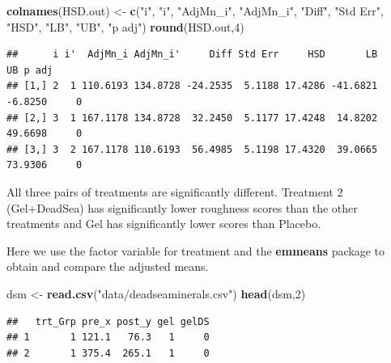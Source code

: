 \documentclass[
]{book}
\newenvironment{Shaded}{\begin{snugshade}}{\end{snugshade}}
\newcommand{\DecValTok}[1]{\textcolor[rgb]{0.00,0.00,0.81}{#1}}
\newcommand{\FunctionTok}[1]{\textcolor[rgb]{0.13,0.29,0.53}{\textbf{#1}}}
\newcommand{\NormalTok}[1]{#1}
\newcommand{\OtherTok}[1]{\textcolor[rgb]{0.56,0.35,0.01}{#1}}
\newcommand{\StringTok}[1]{\textcolor[rgb]{0.31,0.60,0.02}{#1}}
\begin{document}
\begin{Shaded}
\begin{Highlighting}[]
\FunctionTok{colnames}\NormalTok{(HSD.out) }\OtherTok{\textless{}{-}} \FunctionTok{c}\NormalTok{(}\StringTok{"i"}\NormalTok{, }\StringTok{"i\textquotesingle{}"}\NormalTok{, }\StringTok{"AdjMn\_i"}\NormalTok{, }\StringTok{"AdjMn\_i\textquotesingle{}"}\NormalTok{, }\StringTok{"Diff"}\NormalTok{, }\StringTok{"Std Err"}\NormalTok{, }
                      \StringTok{"HSD"}\NormalTok{, }\StringTok{"LB"}\NormalTok{, }\StringTok{"UB"}\NormalTok{, }\StringTok{"p adj"}\NormalTok{)}
\FunctionTok{round}\NormalTok{(HSD.out,}\DecValTok{4}\NormalTok{)}
\end{Highlighting}
\end{Shaded}

\begin{verbatim}
##      i i'  AdjMn_i AdjMn_i'     Diff Std Err     HSD       LB      UB p adj
## [1,] 2  1 110.6193 134.8728 -24.2535  5.1188 17.4286 -41.6821 -6.8250     0
## [2,] 3  1 167.1178 134.8728  32.2450  5.1177 17.4248  14.8202 49.6698     0
## [3,] 3  2 167.1178 110.6193  56.4985  5.1198 17.4320  39.0665 73.9306     0
\end{verbatim}

All three pairs of treatments are significantly different. Treatment 2
(Gel+DeadSea) has significantly lower roughness scores than the other
treatments and Gel has significantly lower scores than Placebo.

Here we use the factor variable for treatment and the \textbf{emmeans}
package to obtain and compare the adjusted means.

\begin{Shaded}
\begin{Highlighting}[]
\NormalTok{dsm }\OtherTok{\textless{}{-}} \FunctionTok{read.csv}\NormalTok{(}\StringTok{"data/deadseaminerals.csv"}\NormalTok{)}
\FunctionTok{head}\NormalTok{(dsm,}\DecValTok{2}\NormalTok{)}
\end{Highlighting}
\end{Shaded}

\begin{verbatim}
##   trt_Grp pre_x post_y gel gelDS
## 1       1 121.1   76.3   1     0
## 2       1 375.4  265.1   1     0
\end{verbatim}
\end{document}

